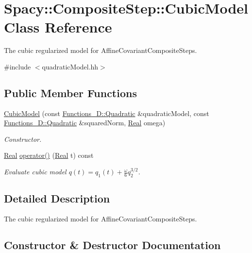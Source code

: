 \hypertarget{classSpacy_1_1CompositeStep_1_1CubicModel}{}\section{Spacy\+:\+:Composite\+Step\+:\+:Cubic\+Model Class Reference}
\label{classSpacy_1_1CompositeStep_1_1CubicModel}


The cubic regularized model for Affine\+Covariant\+Composite\+Steps.  




{\ttfamily \#include $<$quadratic\+Model.\+hh$>$}

\subsection*{Public Member Functions}
\begin{DoxyCompactItemize}
\item 
\hyperlink{classSpacy_1_1CompositeStep_1_1CubicModel_abbae58ccfdd50120fc10245251048b91}{Cubic\+Model} (const \hyperlink{classSpacy_1_1Functions__1D_1_1Quadratic}{Functions\+\_\+D\+::\+Quadratic} \&quadratic\+Model, const \hyperlink{classSpacy_1_1Functions__1D_1_1Quadratic}{Functions\+\_\+D\+::\+Quadratic} \&squared\+Norm, \hyperlink{classSpacy_1_1Real}{Real} omega)
\begin{DoxyCompactList}\small\item\em Constructor. \end{DoxyCompactList}\item 
\hyperlink{classSpacy_1_1Real}{Real} \hyperlink{classSpacy_1_1CompositeStep_1_1CubicModel_a5669f387117cfdc47b5be45a29f387ce}{operator()} (\hyperlink{classSpacy_1_1Real}{Real} t) const 
\begin{DoxyCompactList}\small\item\em Evaluate cubic model $ q(t) = q_1(t) + \frac{\omega}{6}q_2^{3/2} $. \end{DoxyCompactList}\end{DoxyCompactItemize}


\subsection{Detailed Description}
The cubic regularized model for Affine\+Covariant\+Composite\+Steps. 

\subsection{Constructor \& Destructor Documentation}
\hypertarget{classSpacy_1_1CompositeStep_1_1CubicModel_abbae58ccfdd50120fc10245251048b91}{}
